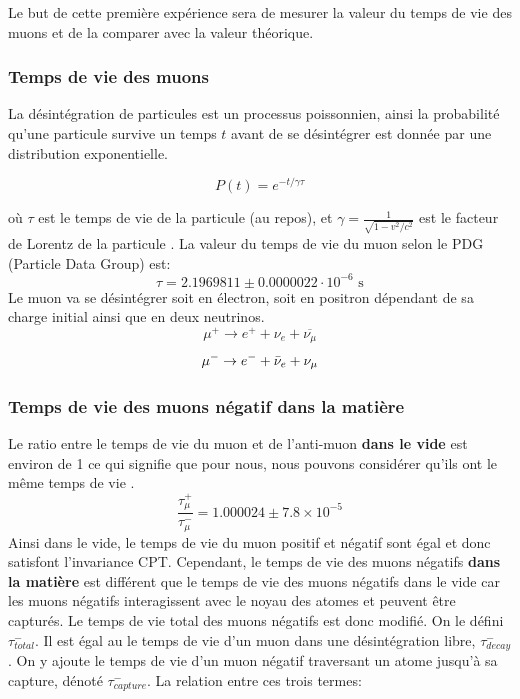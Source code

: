 \documentclass[12pt]{article}
\begin{document}
Le but de cette première expérience sera de mesurer la valeur du temps de vie des muons et de la comparer avec la valeur théorique.

\subsubsection{Temps de vie des muons}
La désintégration de particules est un processus poissonnien, ainsi la probabilité qu'une particule survive un temps $t$ avant de se désintégrer est donnée par une distribution exponentielle.

\begin{equation}
P(t) = e^{-t/\gamma\tau}
\end{equation}

où $\tau$  est le temps de vie de la particule (au repos), et $\gamma = \frac{1}{\sqrt{1-v^2/c^2}}$ est le facteur de Lorentz de la particule \cite{noauthor_particle_2019}. La valeur du temps de vie du muon selon le PDG (Particle Data Group)\cite{PhysRevD.98.030001} est: \[\tau = 2.1969811\pm0.0000022\cdot10^{-6} \text{ s}\]
Le muon va se désintégrer soit en électron, soit en positron dépendant de sa charge initial ainsi que en deux neutrinos.
\[\mu^{+}\to e^{+}+\nu_{e}+\overline{\nu_{\mu}} \]
\[ \mu^{-} \rightarrow e^{-} + \Bar{\nu}_{e} + \nu_{\mu} \]


\subsubsection{Temps de vie des muons négatif dans la matière}

Le ratio entre le temps de vie du muon et de l'anti-muon \textbf{dans le vide} est environ de 1 ce qui signifie que pour nous, nous pouvons considérer qu'ils ont le même temps de vie \cite{haxton_symmetries_1995}.
\[\frac{\tau^{+}_{\mu}}{\tau^{-}_{\mu}}=1.000024\pm7.8\times10^{-5}\]
Ainsi dans le vide, le temps de vie du muon positif et négatif sont égal et donc satisfont l'invariance CPT. Cependant, le temps de vie des muons négatifs \textbf{dans la matière} est différent que le temps de vie des muons négatifs dans le vide car les muons négatifs interagissent avec le noyau des atomes et peuvent être capturés. Le temps de vie total des muons négatifs est donc modifié. On le défini $\tau_{total}^{-}$. Il est égal au le temps de vie d'un muon dans une désintégration libre, $\tau_{decay}^{-}$. On y ajoute le temps de vie d'un  muon négatif traversant un atome jusqu'à sa capture, dénoté  $\tau_{capture}^{-}$. La relation entre ces trois termes: 
\end{document}
